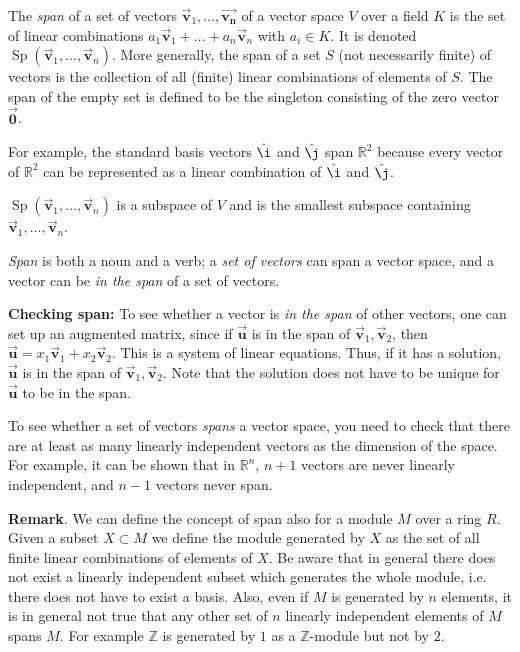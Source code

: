 \documentclass{article}
\def\vec#1{\overrightarrow{\mathbf{#1}}}
\def\R{\mathbb{R}}
\def\Sp{\operatorname{Sp}}
\newcommand{\ZZ}{\mathbb{Z}}
\begin{document}
The \emph{span} of a set of vectors $\vec{v}_1,\dots,\vec{v_n}$ of a vector space $V$ over a field $K$ is the set of linear combinations $a_1\vec{v}_1+\dots+a_n\vec{v}_n$ with $a_i\in K$.  It is denoted $\Sp(\vec{v}_1,\dots,\vec{v}_n)$.   More generally, the span of a set $S$ (not necessarily finite) of vectors is the collection of all (finite) linear combinations of elements of $S$.  The span of the empty set is defined to be the singleton consisting of the zero vector $\vec{0}$.

For example, the standard basis vectors $\hat{\i}$ and $\hat{\j}$ span $\R^2$ because every vector of $\R^2$ can be represented as a linear combination of $\hat{\i}$ and $\hat{\j}$. 

$\Sp(\vec{v}_1,\dots,\vec{v}_n)$ is a subspace of $V$ and is the smallest subspace containing $\vec{v}_1,\dots,\vec{v}_n$.

\emph{Span} is both a noun and a verb; a \emph{set of vectors} can span a vector space, and a vector can be \emph{in the span} of a set of vectors.

\textbf{Checking span:} To see whether a vector is \emph{in the span} of other vectors, one can set up an augmented matrix, since if $\vec{u}$ is in the span of $\vec{v}_1,\vec{v}_2$, then $\vec{u} = x_1\vec{v}_1 + x_2\vec{v}_2$. This is a system of linear equations. Thus, if it has a solution, $\vec{u}$ is in the span of $\vec{v}_1,\vec{v}_2$. Note that the solution does not have to be unique for $\vec{u}$ to be in the span.

To see whether a set of vectors \emph{spans} a vector space, you need to check that there are at least as many linearly independent vectors as the dimension of the space. For example, it can be shown that in $\R^n$, $n+1$ vectors are never linearly independent, and $n-1$ vectors never span.

\textbf{Remark}.  We can define the concept of span also for a module $M$ over a ring $R$. 
Given a subset $X\subset M$ we define the module generated by $X$ as the set of all finite linear combinations of elements of $X$.
Be aware that in general there does not exist a linearly independent subset which generates the whole module, i.e. there does not have to exist a basis.
Also, even if $M$ is generated by $n$ elements, it is in general not true that any other set of $n$ linearly independent elements of $M$ spans $M$. 
For example $\ZZ$ is generated by $1$ as a $\ZZ$-module but not by $2$.
\end{document}

